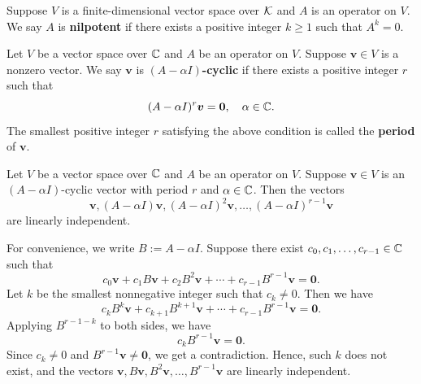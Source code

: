 \begin{definitionenv}
    Suppose $V$ is a finite-dimensional vector space over $\mathcal{K}$ and $A$ is an operator on $V$. We say $A$ is \textbf{nilpotent} if there exists a positive integer $k\ge 1$ such that $A^k = 0$.
\end{definitionenv}
\begin{definitionenv}
    Let $V$ be a vector space over $\mathbb{C}$ and $A$ be an operator on $V$. Suppose $\bm v \in V$ is a nonzero vector. We say $\bm v$ is \textbf{$(A-\alpha I)$-cyclic} if there exists a positive integer $r$ such that
    $$ (A - \alpha I)^r \bm v = \bm 0, \quad \alpha \in \mathbb{C}. $$
    The smallest positive integer $r$ satisfying the above condition is called the \textbf{period} of $\bm v$.
\end{definitionenv}
\begin{lemmaenv}
    Let $V$ be a vector space over $\mathbb{C}$ and $A$ be an operator on $V$. Suppose $\bm v \in V$ is an $(A-\alpha I)$-cyclic vector with period $r$ and $\alpha \in \mathbb{C}$. Then the vectors
    $$ \bm v, (A-\alpha I) \bm v, (A-\alpha I)^2 \bm v, \ldots, (A-\alpha I)^{r-1} \bm v $$
    are linearly independent.
\end{lemmaenv}
\begin{proofenv}
    For convenience, we write $B := A - \alpha I$. Suppose there exist $c_0, c_1, \ldots, c_{r-1} \in \mathbb{C}$ such that
    $$ c_0 \bm v + c_1 B \bm v + c_2 B^2 \bm v + \cdots + c_{r-1} B^{r-1} \bm v = \bm 0. $$
    Let $k$ be the smallest nonnegative integer such that $c_k \ne 0$. Then we have
    $$ c_k B^k \bm v + c_{k+1} B^{k+1} \bm v + \cdots + c_{r-1} B^{r-1} \bm v = \bm 0. $$
    Applying $B^{r-1-k}$ to both sides, we have
    $$ c_k B^{r-1} \bm v = \bm 0. $$
    Since $c_k \ne 0$ and $B^{r-1} \bm v \ne \bm 0$, we get a contradiction. Hence, such $k$ does not exist, and the vectors $\bm v, B \bm v, B^2 \bm v, \ldots, B^{r-1} \bm v$ are linearly independent.
\end{proofenv}
